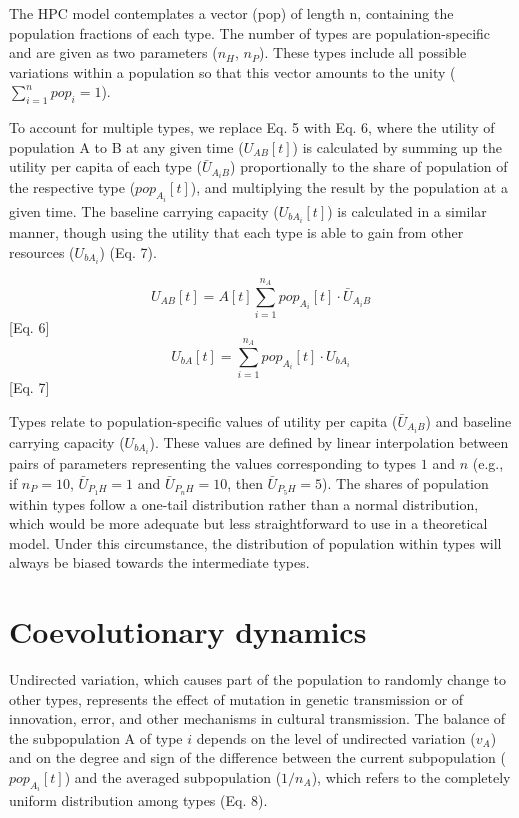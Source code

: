 \documentclass[
]{book}
\begin{document}
The HPC model contemplates a vector (pop) of length n, containing the population fractions of each type. The number of types are population-specific and are given as two parameters (\(n_{H}\), \(n_{P}\)). These types include all possible variations within a population so that this vector amounts to the unity (\(\sum_{i=1}^{n}{pop_{i}}=1\)).

To account for multiple types, we replace Eq. 5 with Eq. 6, where the utility of population A to B at any given time (\(U_{AB}[t]\)) is calculated by summing up the utility per capita of each type (\(\bar{U}_{A_{i}B}\)) proportionally to the share of population of the respective type (\(pop_{A_{i}}[t]\)), and multiplying the result by the population at a given time. The baseline carrying capacity (\(U_{bA_{i}}[t]\)) is calculated in a similar manner, though using the utility that each type is able to gain from other resources (\(U_{bA_{i}}\)) (Eq. 7).

\[U_{AB}[t]=A[t]\sum_{i=1}^{n_{A}}{pop_{A_{i}}[t]\cdot \bar{U}_{A_{i}B}}\] {[}Eq. 6{]}
\[U_{bA}[t]=\sum_{i=1}^{n_{A}}{pop_{A_{i}}[t]\cdot U_{bA_{i}}}\] {[}Eq. 7{]}

Types relate to population-specific values of utility per capita (\(\bar{U}_{A_{i}B}\)) and baseline carrying capacity (\(U_{bA_{i}}\)). These values are defined by linear interpolation between pairs of parameters representing the values corresponding to types \(1\) and \(n\) (e.g., if \(n_P=10\), \(\bar{U}_{P_{1}H}=1\) and \(\bar{U}_{P_{n}H}=10\), then \(\bar{U}_{P_{5}H}=5\)). The shares of population within types follow a one-tail distribution rather than a normal distribution, which would be more adequate but less straightforward to use in a theoretical model. Under this circumstance, the distribution of population within types will always be biased towards the intermediate types.

\hypertarget{coevolutionary-dynamics}{%
\section*{Coevolutionary dynamics}\label{coevolutionary-dynamics}}

Undirected variation, which causes part of the population to randomly change to other types, represents the effect of mutation in genetic transmission or of innovation, error, and other mechanisms in cultural transmission. The balance of the subpopulation A of type \(i\) depends on the level of undirected variation (\(v_{A}\)) and on the degree and sign of the difference between the current subpopulation (\(pop_{A_{i}}[t]\)) and the averaged subpopulation (\(1/n_{A}\)), which refers to the completely uniform distribution among types (Eq. 8).
\end{document}

